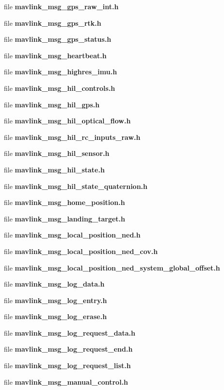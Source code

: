 \begin{DoxyCompactItemize}
file \textbf{ mavlink\+\_\+msg\+\_\+gps\+\_\+raw\+\_\+int.\+h}
\item 
file \textbf{ mavlink\+\_\+msg\+\_\+gps\+\_\+rtk.\+h}
\item 
file \textbf{ mavlink\+\_\+msg\+\_\+gps\+\_\+status.\+h}
\item 
file \textbf{ mavlink\+\_\+msg\+\_\+heartbeat.\+h}
\item 
file \textbf{ mavlink\+\_\+msg\+\_\+highres\+\_\+imu.\+h}
\item 
file \textbf{ mavlink\+\_\+msg\+\_\+hil\+\_\+controls.\+h}
\item 
file \textbf{ mavlink\+\_\+msg\+\_\+hil\+\_\+gps.\+h}
\item 
file \textbf{ mavlink\+\_\+msg\+\_\+hil\+\_\+optical\+\_\+flow.\+h}
\item 
file \textbf{ mavlink\+\_\+msg\+\_\+hil\+\_\+rc\+\_\+inputs\+\_\+raw.\+h}
\item 
file \textbf{ mavlink\+\_\+msg\+\_\+hil\+\_\+sensor.\+h}
\item 
file \textbf{ mavlink\+\_\+msg\+\_\+hil\+\_\+state.\+h}
\item 
file \textbf{ mavlink\+\_\+msg\+\_\+hil\+\_\+state\+\_\+quaternion.\+h}
\item 
file \textbf{ mavlink\+\_\+msg\+\_\+home\+\_\+position.\+h}
\item 
file \textbf{ mavlink\+\_\+msg\+\_\+landing\+\_\+target.\+h}
\item 
file \textbf{ mavlink\+\_\+msg\+\_\+local\+\_\+position\+\_\+ned.\+h}
\item 
file \textbf{ mavlink\+\_\+msg\+\_\+local\+\_\+position\+\_\+ned\+\_\+cov.\+h}
\item 
file \textbf{ mavlink\+\_\+msg\+\_\+local\+\_\+position\+\_\+ned\+\_\+system\+\_\+global\+\_\+offset.\+h}
\item 
file \textbf{ mavlink\+\_\+msg\+\_\+log\+\_\+data.\+h}
\item 
file \textbf{ mavlink\+\_\+msg\+\_\+log\+\_\+entry.\+h}
\item 
file \textbf{ mavlink\+\_\+msg\+\_\+log\+\_\+erase.\+h}
\item 
file \textbf{ mavlink\+\_\+msg\+\_\+log\+\_\+request\+\_\+data.\+h}
\item 
file \textbf{ mavlink\+\_\+msg\+\_\+log\+\_\+request\+\_\+end.\+h}
\item 
file \textbf{ mavlink\+\_\+msg\+\_\+log\+\_\+request\+\_\+list.\+h}
\item 
file \textbf{ mavlink\+\_\+msg\+\_\+manual\+\_\+control.\+h}

\end{DoxyCompactItemize}
